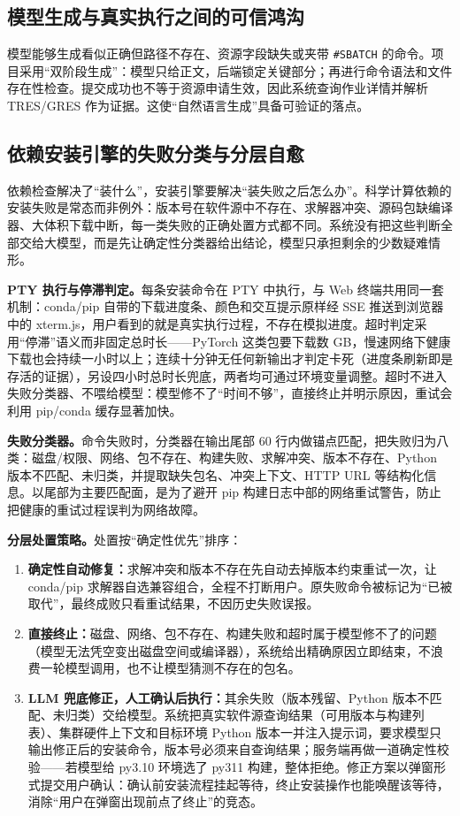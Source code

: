 \documentclass[UTF8,11pt,a4paper]{ctexart}
\newcommand{\code}[1]{\texttt{\small #1}}
\begin{document}
\subsection{模型生成与真实执行之间的可信鸿沟}
模型能够生成看似正确但路径不存在、资源字段缺失或夹带 \code{\#SBATCH} 的命令。项目采用“双阶段生成”：模型只给正文，后端锁定关键部分；再进行命令语法和文件存在性检查。提交成功也不等于资源申请生效，因此系统查询作业详情并解析 TRES/GRES 作为证据。这使“自然语言生成”具备可验证的落点。

\subsection{依赖安装引擎的失败分类与分层自愈}
依赖检查解决了“装什么”，安装引擎要解决“装失败之后怎么办”。科学计算依赖的安装失败是常态而非例外：版本号在软件源中不存在、求解器冲突、源码包缺编译器、大体积下载中断，每一类失败的正确处置方式都不同。系统没有把这些判断全部交给大模型，而是先让确定性分类器给出结论，模型只承担剩余的少数疑难情形。

\textbf{PTY 执行与停滞判定。}每条安装命令在 PTY 中执行，与 Web 终端共用同一套机制：conda/pip 自带的下载进度条、颜色和交互提示原样经 SSE 推送到浏览器中的 xterm.js，用户看到的就是真实执行过程，不存在模拟进度。超时判定采用“停滞”语义而非固定总时长——PyTorch 这类包要下载数 GB，慢速网络下健康下载也会持续一小时以上；连续十分钟无任何新输出才判定卡死（进度条刷新即是存活的证据），另设四小时总时长兜底，两者均可通过环境变量调整。超时不进入失败分类器、不喂给模型：模型修不了“时间不够”，直接终止并明示原因，重试会利用 pip/conda 缓存显著加快。

\textbf{失败分类器。}命令失败时，分类器在输出尾部 60 行内做锚点匹配，把失败归为八类：磁盘/权限、网络、包不存在、构建失败、求解冲突、版本不存在、Python 版本不匹配、未归类，并提取缺失包名、冲突上下文、HTTP URL 等结构化信息。以尾部为主要匹配面，是为了避开 pip 构建日志中部的网络重试警告，防止把健康的重试过程误判为网络故障。

\textbf{分层处置策略。}处置按“确定性优先”排序：
\begin{enumerate}
  \item \textbf{确定性自动修复：}求解冲突和版本不存在先自动去掉版本约束重试一次，让 conda/pip 求解器自选兼容组合，全程不打断用户。原失败命令被标记为“已被取代”，最终成败只看重试结果，不因历史失败误报。
  \item \textbf{直接终止：}磁盘、网络、包不存在、构建失败和超时属于模型修不了的问题（模型无法凭空变出磁盘空间或编译器），系统给出精确原因立即结束，不浪费一轮模型调用，也不让模型猜测不存在的包名。
  \item \textbf{LLM 兜底修正，人工确认后执行：}其余失败（版本残留、Python 版本不匹配、未归类）交给模型。系统把真实软件源查询结果（可用版本与构建列表）、集群硬件上下文和目标环境 Python 版本一并注入提示词，要求模型只输出修正后的安装命令，版本号必须来自查询结果；服务端再做一道确定性校验——若模型给 py3.10 环境选了 py311 构建，整体拒绝。修正方案以弹窗形式提交用户确认：确认前安装流程挂起等待，终止安装操作也能唤醒该等待，消除“用户在弹窗出现前点了终止”的竞态。
\end{enumerate}
\end{document}
